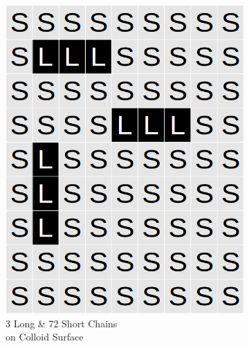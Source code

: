 \documentclass[journal=jacsat,manuscript=article]{achemso}
\begin{document}
\begin{figure}[H]
\begin{subfigure}[b]{0.4\textwidth}
        \includegraphics[scale=0.15]{fig8d.png}
        \caption{3 Long \& 72 Short Chains\\ on Colloid Surface}
        \label{fig:D}
    \end{subfigure}
    \begin{subfigure}[b]{0.4\textwidth}

\end{subfigure}
\end{figure}
\end{document}
